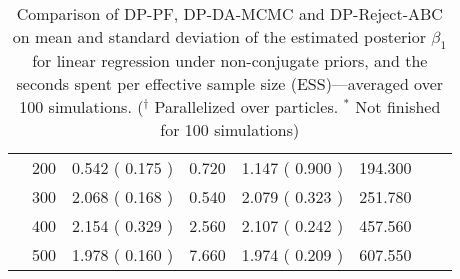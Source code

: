 \begin{table}[!htbp]
{\begin{tabular}{|c|c|cc|cc|cc|}
      & 200 & 0.542 ( 0.175 ) & 0.720 & 1.147 ( 0.900 ) & 194.300 &  &  \\ 
      & 300 & 2.068 ( 0.168 ) & 0.540 & 2.079 ( 0.323 ) & 251.780 &  &  \\ 
      & 400 & 2.154 ( 0.329 ) & 2.560 & 2.107 ( 0.242 ) & 457.560 &  &  \\ 
      & 500 & 1.978 ( 0.160 ) & 7.660 & 1.974 ( 0.209 ) & 607.550 &  &  \\ 
       \hline
    \end{tabular}
    }
    \caption{Comparison of DP-PF, DP-DA-MCMC and DP-Reject-ABC on mean and standard deviation of the estimated posterior $\beta_1$ for linear regression under non-conjugate priors, and the seconds spent per effective sample size (ESS)---averaged over 100 simulations. ($^\dagger$ Parallelized over particles. $^*$ Not finished for 100 simulations)}
  \end{table}
    